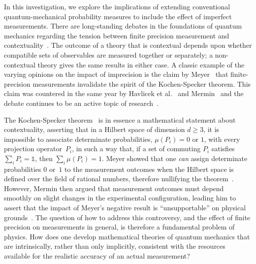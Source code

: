 \documentclass[english,reprint, aps, prl,superscriptaddress, showpacs,
showkeys, longbibliography, amsmath, amssymb, floatfix]{revtex4-1}
\theoremstyle{plain}
\theoremstyle{definition}
\begin{document}
In this investigation, we explore the implications of extending
conventional quantum-mechanical probability measures to include the
effect of imperfect measurements.  There are long-standing debates in
the foundations of quantum mechanics regarding the tension between
finite precision measurement and
contextuality~\cite{BarrettKent2004,Appleby_2005}. The outcome of a
theory that is contextual depends upon whether compatible sets of
observables are measured together or separately; a non-contextual
theory gives the same results in either case.  A classic example of
the varying opinions on the impact of imprecision is the claim by
Meyer~\cite{PhysRevLett.83.3751} that finite-precision measurements
invalidate the spirit of the Kochen-Specker theorem. This claim was
countered in the same year by Havlicek et al.~\cite{HKSS1999apsrev4}
and Mermin~\cite{Mermin1999} and the debate continues to be an active
topic of
research~\cite{Kent1999,SimonBruknerZeilinger2001,Cabello2002,Larsson2002,Appleby2002,BarrettKent2004,Appleby_2005,Spekkens2005,GuehneKleinmannCabelloEtAl2010,MazurekPuseyKunjwalEtAl2016}.

The Kochen-Specker
theorem~\cite{BELL_1966,kochenspecker1967,Redhead1987-REDINA,Mermin1990Simple,peres1995quantum,Jaeger2007,Held2016}
is in essence a mathematical statement about contextuality, asserting
that in a Hilbert space of dimension $d \ge 3$, it is impossible to
associate determinate probabilities, $\mu(P_i)= 0$ or $1$, with every
projection operator~$P_i$, in such a way that, if a set of commuting
$P_i$ satisfies $\sum_i P_i = \mathbb{1}$, then $\sum_i \mu(P_i) = 1$.
Meyer showed that one {\it can\/} assign determinate probabilities $0$
or~$1$ to the measurement outcomes when the Hilbert space is defined
over the field of rational numbers, therefore nullifying the
theorem~\cite{PhysRevLett.83.3751}.  However, Mermin then argued that
measurement outcomes must depend smoothly on slight changes in the
experimental configuration, leading him to assert that the impact of
Meyer's negative result is ``unsupportable'' on physical
grounds~\cite{Mermin1999}.  The question of how to address this controversy, and the effect of 
finite precision on measurements in general, is therefore 
a fundamental problem of physics.  How does one
develop mathematical theories of quantum mechanics that are
intrinsically, rather than only implicitly, consistent with the
resources available for the realistic accuracy of an actual
measurement?   
\end{document}
